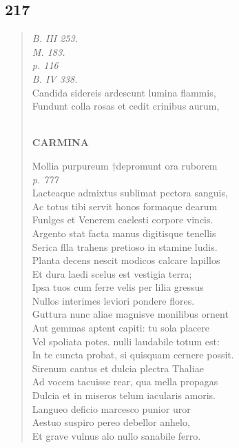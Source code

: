 \documentclass[11pt, a4paper]{report}
\begin{document}
            \subsection*{217}
      \begin{verse}
      \textit{B. III 253.} \\ \textit{M. 183.} \\ \textit{p. 116} \\ \textit{B. IV 338.} \\ Candida sidereis ardescunt lumina flammis, \\ Fundunt colla rosas et cedit crinibus aurum, \\ 
        ﻿\pagebreak 
    \begin{center} \textbf{CARMINA} \end{center}Mollia purpureum †depromunt ora ruborem \\ \textit{p. 777} \\ Lacteaque admixtus sublimat pectora sanguis, \\ Ac totus tibi servit honos formaque dearum \\ Funlges et Venerem caelesti corpore vincis. \\ Argento stat facta manus digitisque tenellis \\ Serica flla trahens pretioso in stamine ludis. \\ Planta decens nescit modicos calcare lapillos \\ Et dura laedi scelus est vestigia terra; \\ Ipsa tuos cum ferre velis per lilia gressus \\ Nullos interimes leviori pondere flores. \\ Guttura nunc aliae magnisve monilibus ornent \\ Aut gemmas aptent capiti: tu sola placere \\ Vel spoliata potes. nulli laudabile totum est: \\ In te cuncta probat, si quisquam cernere possit. \\ Sirenum cantus et dulcia plectra Thaliae \\ Ad vocem tacuisse rear, qua mella propagas \\ Dulcia et in miseros telum iacularis amoris. \\ Langueo deficio marcesco punior uror \\ Aestuo suspiro pereo debellor anhelo, \\ Et grave vulnus alo nullo sanabile ferro. \\ 

\end{verse}
\end{document}
